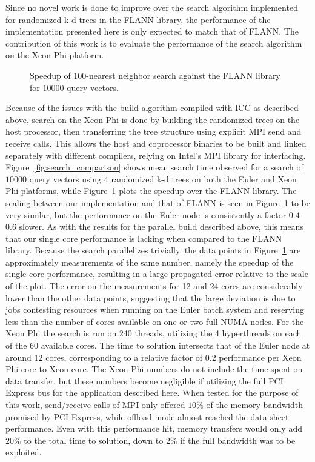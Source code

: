   Since no novel work is done to improve over the 
  search algorithm implemented for randomized k-d trees in the FLANN library, 
  the performance of the implementation presented here is only expected to 
  match that of FLANN. The contribution of this work is to evaluate the 
  performance of the search algorithm on the Xeon Phi platform.   \begin{figure}[tb]
    \centering
    \resizebox{\columnwidth}{!}{}
    \caption{Speedup of $100$-nearest neighbor search against the FLANN library for $10000$ 
    query vectors.}
    \label{fig:search_speedup}
  \end{figure}
  Because of the issues with the build algorithm compiled with ICC as described 
  above, search on the Xeon Phi is done by building the randomized trees on the 
  host processor, then transferring the tree structure using explicit MPI send and receive 
  calls. This allows the host and coprocessor binaries to be built and linked 
  separately with different compilers, relying on Intel's MPI library for 
  interfacing.
  Figure~\ref{fig:search_comparison} shows mean search time observed for a search of $10000$ query vectors using $4$ randomized k-d trees on both the Euler and Xeon Phi platforms, while Figure~\ref{fig:search_speedup} plots the speedup over the FLANN library. %
  The scaling between our implementation and that of FLANN is seen in Figure~\ref{fig:search_speedup} to be very similar, but the performance on the Euler node is consistently a factor $0.4$-$0.6$ slower. As with the results for the parallel build described above, this means that our single core performance is lacking when compared to the FLANN library. Because the search parallelizes trivially, the data points in Figure~\ref{fig:search_speedup} are approximately measurements of the same
  number, namely the speedup of the single core performance, resulting in a large propagated error relative to the scale of the plot. The error on the measurements for 12 and 24 cores are considerably lower than the other data points, suggesting that the large deviation is due to jobs contesting resources when running on the Euler batch system and reserving less than the number of cores available on one or two full NUMA nodes.
  For the Xeon Phi the search is run on 240 threads, utilizing the 4 hyperthreads on each of the 60 available cores. The time to solution intersects that of the Euler node at around 12 cores, corresponding to a relative factor of $0.2$ performance per Xeon Phi core to Xeon core. The Xeon Phi numbers do not include the time spent on data transfer, but these numbers become negligible if utilizing the full PCI Express bus for the application described here. When tested for the purpose of this
  work, send/receive calls of MPI only offered $10\%$ of the memory bandwidth promised by PCI Express, while offload mode almost reached the data sheet performance. Even with this performance hit, memory transfers would only add $20\%$ to the total time to solution, down to $2\%$ if the full bandwidth was to be exploited. 

